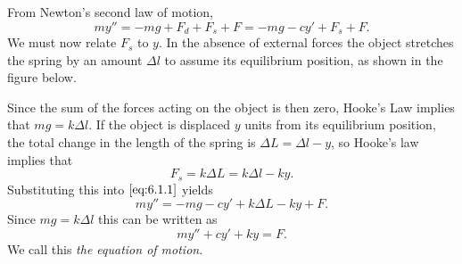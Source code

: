 \documentclass{ximera}
\begin{document}
 
 
From Newton's second law of motion,
\begin{equation}\label{eq:6.1.1}
my''=-mg+F_d+F_s+F=-mg-cy'+F_s+F.
\end{equation}
We must now relate $F_s$ to $y$. In the absence of external forces the
object stretches the spring by an amount $\Delta l$ to assume its
equilibrium position, as shown in the figure below.

\begin{center}
\end{center}

 
Since the sum of the forces acting on the object
is then zero, Hooke's Law implies that $mg=k\Delta l$. If the object
is displaced $y$ units from its equilibrium position, the total
change in the length of the spring is $\Delta L=\Delta l-y$,
 so Hooke's law implies that
 $$
F_s=k\Delta L=k\Delta l-ky.
$$
Substituting this into $\eqref{eq:6.1.1}$ yields
$$
my''=-mg-cy'+k\Delta L-ky+F.
$$
Since $mg=k\Delta l$ this can be written as
\begin{equation}\label{eq:6.1.2}
my''+cy'+ky=F.
\end{equation}
We call this \textit{the equation of motion}.
 
\end{document}
